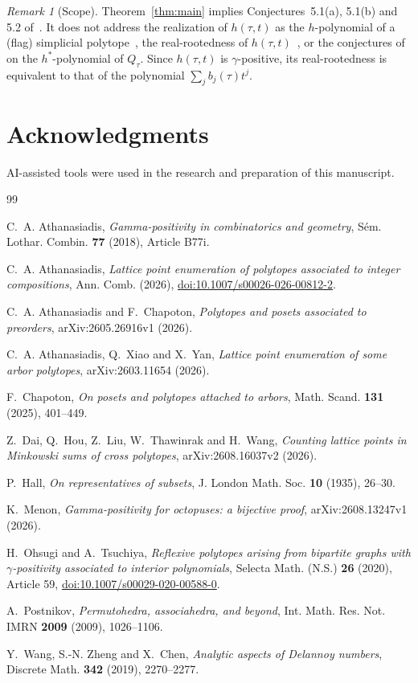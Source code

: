 \documentclass[11pt]{amsart}
\theoremstyle{definition}
\theoremstyle{remark}
\newtheorem{remark}[theorem]{Remark}
\numberwithin{equation}{section}
\begin{document}
\begin{remark}[Scope]
Theorem~\ref{thm:main} implies Conjectures~5.1(a), 5.1(b) and 5.2 of~\cite{AC}. It does not address the realization of $h(\tau,t)$ as the $h$-polynomial of a (flag) simplicial polytope~\cite[Conjecture~5.1(c),(d)]{AC}, the real-rootedness of $h(\tau,t)$~\cite[Conjecture~5.3]{AC}, or the conjectures of~\cite{AC} on the $h^*$-polynomial of $Q_\tau$. Since $h(\tau,t)$ is $\gamma$-positive, its real-rootedness is equivalent to that of the polynomial $\sum_j b_j(\tau)t^j$.
\end{remark}

\section*{Acknowledgments}
AI-assisted tools were used in the research and preparation of this manuscript.

\begin{thebibliography}{99}

C.~A. Athanasiadis, \emph{Gamma-positivity in combinatorics and geometry}, S\'em. Lothar. Combin. \textbf{77} (2018), Article B77i.

C.~A. Athanasiadis, \emph{Lattice point enumeration of polytopes associated to integer compositions}, Ann. Comb. (2026), \href{https://doi.org/10.1007/s00026-026-00812-2}{doi:10.1007/s00026-026-00812-2}.

C.~A. Athanasiadis and F.~Chapoton, \emph{Polytopes and posets associated to preorders}, arXiv:2605.26916v1 (2026).

C.~A. Athanasiadis, Q.~Xiao and X.~Yan, \emph{Lattice point enumeration of some arbor polytopes}, arXiv:2603.11654 (2026).

F.~Chapoton, \emph{On posets and polytopes attached to arbors}, Math. Scand. \textbf{131} (2025), 401--449.

Z.~Dai, Q.~Hou, Z.~Liu, W.~Thawinrak and H.~Wang, \emph{Counting lattice points in Minkowski sums of cross polytopes}, arXiv:2608.16037v2 (2026).

P.~Hall, \emph{On representatives of subsets}, J. London Math. Soc. \textbf{10} (1935), 26--30.

K.~Menon, \emph{Gamma-positivity for octopuses: a bijective proof}, arXiv:2608.13247v1 (2026).

H.~Ohsugi and A.~Tsuchiya, \emph{Reflexive polytopes arising from bipartite graphs with $\gamma$-positivity associated to interior polynomials}, Selecta Math. (N.S.) \textbf{26} (2020), Article 59, \href{https://doi.org/10.1007/s00029-020-00588-0}{doi:10.1007/s00029-020-00588-0}.

A.~Postnikov, \emph{Permutohedra, associahedra, and beyond}, Int. Math. Res. Not. IMRN \textbf{2009} (2009), 1026--1106.

Y.~Wang, S.-N. Zheng and X.~Chen, \emph{Analytic aspects of Delannoy numbers}, Discrete Math. \textbf{342} (2019), 2270--2277.

\end{thebibliography}
\end{document}
